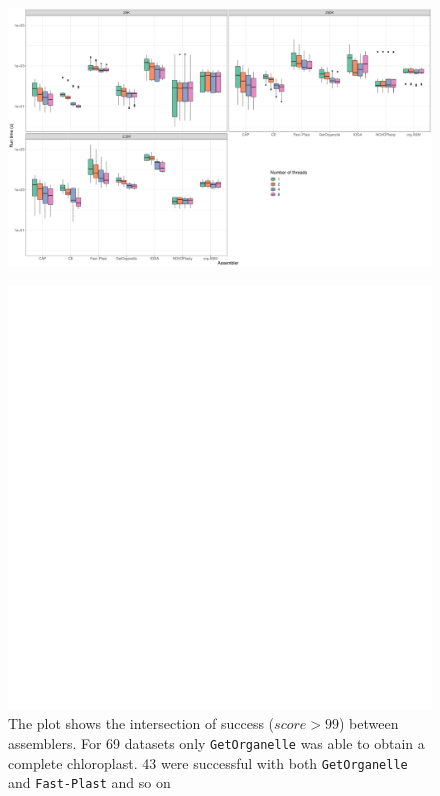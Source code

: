 \documentclass{bmcart}
\newcommand{\formatprogramnames}[1]{\texttt{#1}}
\newcommand{\fp}{\formatprogramnames{Fast-Plast}}
\newcommand{\go}{\formatprogramnames{GetOrganelle}}
\begin{document}
\begin{backmatter}
\begin{figure}[h!]
  \includegraphics[width=\textwidth]{plots/comp_time_log.pdf}
  \caption{
  }
        \label{fig:performance_runtime}
      \end{figure}

\begin{figure}[h!]
  \includegraphics[width=\textwidth,page=2]{plots/upset.pdf}
  \caption{
      The plot shows the intersection of success ($score > 99$) between assemblers. For \num{69} datasets only \go{} was able to obtain a complete chloroplast. \num{43} were successful with both \go{} and \fp{} and so on}
            \label{fig:upset}
      \end{figure}


\end{backmatter}
\end{document}
